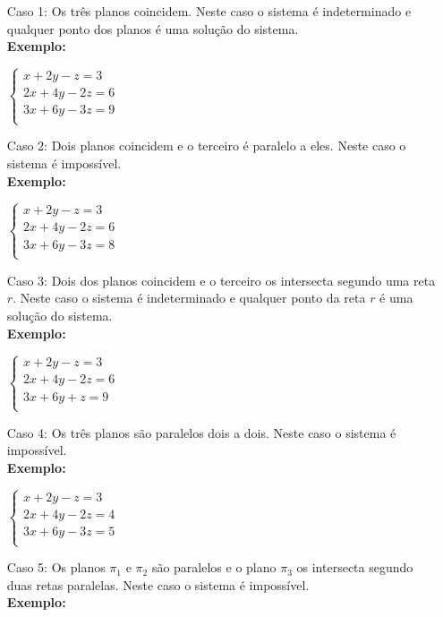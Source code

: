 \documentclass[oneside,a4paper,12pt]{article}
\begin{document}
\begin{enumerate}
	\item [Caso 1:] Os três planos coincidem. Neste caso o sistema é indeterminado e qualquer ponto dos planos é uma solução do sistema. \\
	\textbf{Exemplo: }
	
	$
	\left\{
	\begin{array}{c}
	x + 2y - z = 3 \\
	2x+ 4y - 2z = 6 \\
	3x+ 6y - 3z = 9 \\
	\end{array}
	\right.
	$
	
	\item[Caso 2:] Dois planos coincidem e o terceiro é paralelo a eles. Neste caso o sistema é impossível. \\
	\textbf{Exemplo: }
	
	$
	\left\{
	\begin{array}{c}
	x + 2y - z = 3 \\
	2x+ 4y - 2z = 6 \\
	3x+ 6y - 3z = 8 \\
	\end{array}
	\right.
	$
	
	\item [Caso 3:] Dois dos planos coincidem e o terceiro os intersecta segundo uma reta $r$. Neste caso	o sistema é indeterminado e qualquer ponto da reta $r$ é uma solução do sistema. \\
	\textbf{Exemplo: }
	
	$
	\left\{
	\begin{array}{c}
	x + 2y - z = 3 \\
	2x+ 4y - 2z = 6 \\
	3x+ 6y + z = 9 \\
	\end{array}
	\right.
	$
	
	\item [Caso 4:] Os três planos são paralelos dois a dois. Neste caso o sistema é impossível. \\
	\textbf{Exemplo: }

	$
	\left\{
	\begin{array}{c}
	x + 2y - z = 3 \\
	2x+ 4y - 2z = 4 \\
	3x+ 6y - 3z = 5 \\
	\end{array}
	\right.
	$	
	
	\item [Caso 5:] Os planos $\pi_1$ e $\pi_2$ são paralelos e o plano $\pi_3$ os intersecta segundo duas retas paralelas. Neste caso o sistema é impossível. \\
	\textbf{Exemplo: }
	

\end{enumerate}
\end{document}
